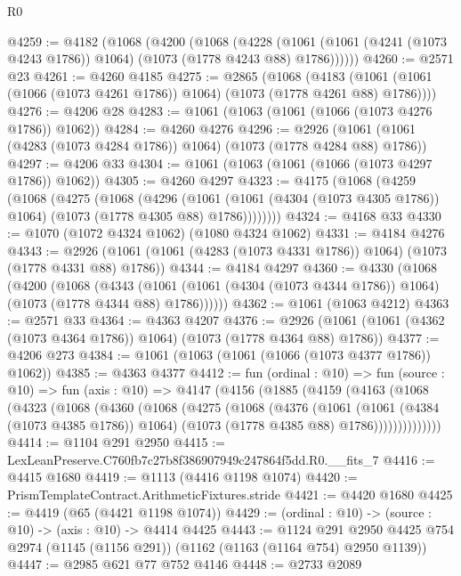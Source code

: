 \begin{lexlean}{R0}
\begin{coremodule}
@4259 := @4182
    (@1068
      (@4200
        (@1068
          (@4228
            (@1061 (@1061 (@4241 (@1073 @4243 @1786)) @1064) (@1073 (@1778 @4243 @88) @1786))))))
@4260 := @2571 @23
@4261 := @4260 @4185
@4275 := @2865
    (@1068
      (@4183 (@1061 (@1061 (@1066 (@1073 @4261 @1786)) @1064) (@1073 (@1778 @4261 @88) @1786))))
@4276 := @4206 @28
@4283 := @1061 (@1063 (@1061 (@1066 (@1073 @4276 @1786)) @1062))
@4284 := @4260 @4276
@4296 := @2926 (@1061 (@1061 (@4283 (@1073 @4284 @1786)) @1064) (@1073 (@1778 @4284 @88) @1786))
@4297 := @4206 @33
@4304 := @1061 (@1063 (@1061 (@1066 (@1073 @4297 @1786)) @1062))
@4305 := @4260 @4297
@4323 := @4175
    (@1068
      (@4259
        (@1068
          (@4275
            (@1068
              (@4296
                (@1061
                  (@1061 (@4304 (@1073 @4305 @1786)) @1064)
                  (@1073 (@1778 @4305 @88) @1786))))))))
@4324 := @4168 @33
@4330 := @1070 (@1072 @4324 @1062) (@1080 @4324 @1062)
@4331 := @4184 @4276
@4343 := @2926 (@1061 (@1061 (@4283 (@1073 @4331 @1786)) @1064) (@1073 (@1778 @4331 @88) @1786))
@4344 := @4184 @4297
@4360 := @4330
    (@1068
      (@4200
        (@1068
          (@4343
            (@1061 (@1061 (@4304 (@1073 @4344 @1786)) @1064) (@1073 (@1778 @4344 @88) @1786))))))
@4362 := @1061 (@1063 @4212)
@4363 := @2571 @33
@4364 := @4363 @4207
@4376 := @2926 (@1061 (@1061 (@4362 (@1073 @4364 @1786)) @1064) (@1073 (@1778 @4364 @88) @1786))
@4377 := @4206 @273
@4384 := @1061 (@1063 (@1061 (@1066 (@1073 @4377 @1786)) @1062))
@4385 := @4363 @4377
@4412 := fun (ordinal : @10) =>
  fun (source : @10) =>
  fun (axis : @10) =>
  @4147
    (@4156
      (@1885
        (@4159
          (@4163
            (@1068
              (@4323
                (@1068
                  (@4360
                    (@1068
                      (@4275
                        (@1068
                          (@4376
                            (@1061
                              (@1061 (@4384 (@1073 @4385 @1786)) @1064)
                              (@1073 (@1778 @4385 @88) @1786))))))))))))))
@4414 := @1104 @291 @2950
@4415 := LexLeanPreserve.C760fb7c27b8f386907949c247864f5dd.R0.__fits_7
@4416 := @4415 @1680
@4419 := @1113 (@4416 @1198 @1074)
@4420 := PrismTemplateContract.ArithmeticFixtures.stride
@4421 := @4420 @1680
@4425 := @4419 (@65 (@4421 @1198 @1074))
@4429 := (ordinal : @10) -> (source : @10) -> (axis : @10) -> @4414 @4425
@4443 := @1124
    @291
    @2950
    @4425
    @754
    @2974
    (@1145 (@1156 @291))
    (@1162 (@1163 (@1164 @754) @2950 @1139))
@4447 := @2985 @621 @77 @752 @4146
@4448 := @2733 @2089

\end{coremodule}
\end{lexlean}
